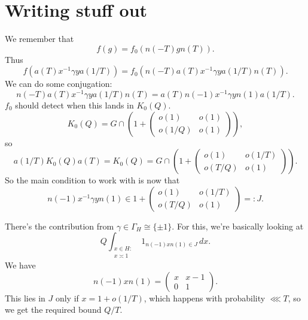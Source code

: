 \documentclass[reqno]{amsart} 
\begin{document}
\section{Writing stuff out}\label{sec:20230522180029}
We remember that
\begin{equation*}
  f (g) = f _0 (n (- T) g n (T)).
\end{equation*}
Thus
\begin{equation*}
  f (a(T) x ^{-1}  \gamma y a(1/T) )
  =
  f_0 (n(-T) a(T) x ^{-1}  \gamma y a(1/T)  n(T)).
\end{equation*}
We can do some conjugation:
\begin{equation*}
  n(-T) a(T) x ^{-1}  \gamma y a(1/T)  n(T)
  =
  a(T) n(-1) x ^{-1}  \gamma y n(1) a(1/T).
\end{equation*}
$f_0$ should detect when this lands in $K_0(Q)$.
\begin{equation*}
  K_0(Q) =
  G \cap 
  \left( 1 + \begin{pmatrix}
    o(1) & o(1) \\
    o(1/Q) & o(1)
  \end{pmatrix}  \right),
\end{equation*}
so
\begin{equation*}
  a(1/T) K_0(Q) a(T) =
  K_0(Q) =
  G \cap 
  \left( 1 +
    \begin{pmatrix}
      o(1) & o(1/T) \\
      o(T/Q) & o(1)
    \end{pmatrix}  \right).
\end{equation*}
So the main condition to work with is now that
\begin{equation*}
  n(-1) x ^{-1} \gamma y n (1) \in
  1 +
  \begin{pmatrix}
    o(1) & o(1/T) \\
    o(T/Q) & o(1)
  \end{pmatrix} =: J.
\end{equation*}

There's the contribution from $\gamma \in \Gamma_H \cong \{\pm 1\}$.  For this, we're basically looking at
\begin{equation*}
  Q
  \int _{
    \substack{
      x \in H :  \\
       x \asymp  1
    }
  }
  1 _{n(-1) x n (1) \in J} \, d x.
\end{equation*}
We have
\begin{equation*}
  n (-1) x n (1)
  =
  \begin{pmatrix}
    x & x-1 \\
    0 & 1
  \end{pmatrix}.
\end{equation*}
This lies in $J$ only if $x = 1 + o(1/T)$, which happens with probability $\lll T$, so we get the required bound $Q/T$.
\end{document}
